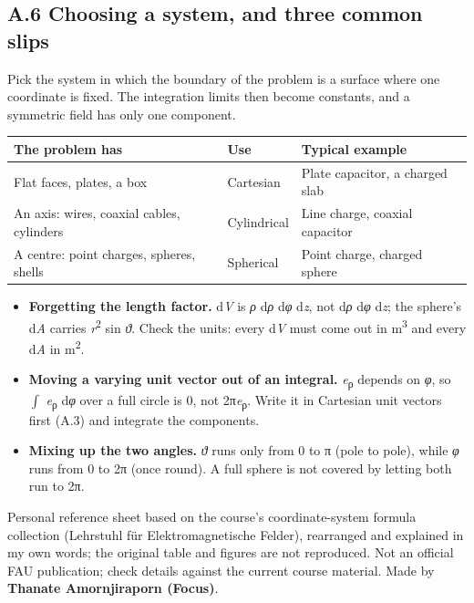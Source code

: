 \documentclass[11pt]{article}
\begin{document}
\begin{keepsection}
\section{A.6 Choosing a system, and three common slips}

Pick the system in which the boundary of the problem is a surface where one coordinate is fixed. The integration limits then become constants, and a symmetric field has only one component.

\begin{center}\small\begin{tabularx}{\linewidth}{>{\raggedright\arraybackslash}X>{\raggedright\arraybackslash}X>{\raggedright\arraybackslash}X}\toprule
\textbf{The problem has} & \textbf{Use} & \textbf{Typical example} \\ \midrule
Flat faces, plates, a box & Cartesian & Plate capacitor, a charged slab \\
An axis: wires, coaxial cables, cylinders & Cylindrical & Line charge, coaxial capacitor \\
A centre: point charges, spheres, shells & Spherical & Point charge, charged sphere \\
\bottomrule\end{tabularx}\end{center}

\begin{itemize}
\item \textbf{Forgetting the length factor.} d\textit{V} is \textit{ρ} d\textit{ρ} d\textit{φ} d\textit{z}, not d\textit{ρ} d\textit{φ} d\textit{z}; the sphere’s d\textit{A} carries \textit{r}\textsuperscript{2} sin \textit{ϑ}. Check the units: every d\textit{V} must come out in m\textsuperscript{3} and every d\textit{A} in m\textsuperscript{2}.
\item \textbf{Moving a varying unit vector out of an integral.} \textit{e}\textsubscript{ρ} depends on \textit{φ}, so $\int $ \textit{e}\textsubscript{ρ} d\textit{φ} over a full circle is 0, not 2π\textit{e}\textsubscript{ρ}. Write it in Cartesian unit vectors first (A.3) and integrate the components.
\item \textbf{Mixing up the two angles.} \textit{ϑ} runs only from 0 to π (pole to pole), while \textit{φ} runs from 0 to 2π (once round). A full sphere is not covered by letting both run to 2π.
\end{itemize}
\end{keepsection}


\vfill{\small Personal reference sheet based on the course’s coordinate-system formula collection (Lehrstuhl für Elektromagnetische Felder), rearranged and explained in my own words; the original table and figures are not reproduced. Not an official FAU publication; check details against the current course material. Made by \textbf{Thanate Amornjiraporn (Focus)}.}
\end{document}
